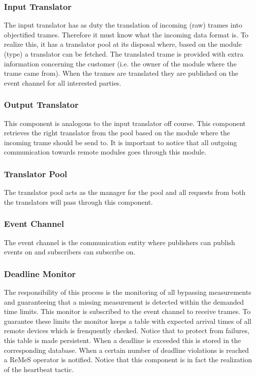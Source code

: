 \subsubsection{Input Translator}

\npar The input translator has as duty the translation of incoming (raw) trames
into objectified trames. Therefore it must know what the incoming data format
is. To realize this, it has a translator pool at its disposal where, based on
the module (type) a translator can be fetched. The translated trame is provided
with extra information concerning the customer (i.e. the owner of the module where the
trame came from). When the trames are translated they are published on the event
channel for all interested parties.

\subsubsection{Output Translator}

\npar This component is analogous to the input translator off course. This
component retrieves the right translator from the pool based on the module
where the incoming trame should be send to. It is important to notice that all
outgoing communication towards remote modules goes through this module.

\subsubsection{Translator Pool}

\npar The translator pool acts as the manager for the pool and all requests from
both the translators will pass through this component. 

\subsubsection{Event Channel}

\npar The event channel is the communication entity where publishers can publish
events on and subscribers can subscribe on.

\subsubsection{Deadline Monitor}

\npar The responsibility of this process is the monitoring of all bypassing
measurements and guaranteeing that a missing measurement is detected within the
demanded time limits. This monitor is subscribed to the event channel to receive
trames. To guarantee these limits the monitor keeps a table with expected
arrival times of all remote devices which is frenquently checked. Notice that to
protect from failures, this table is made persistent. When a deadline is
exceeded this is stored in the corresponding database. When a certain number of
deadline violations is reached a ReMeS operator is notified. Notice that this
component is in fact the realization of the heartbeat tactic. 

